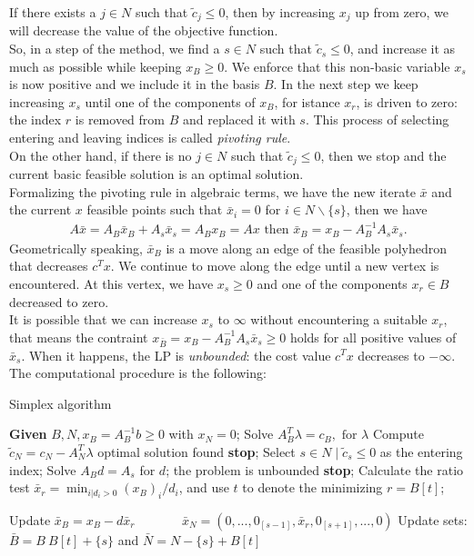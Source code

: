 \documentclass[a4paper,10 pt,titlepage,twoside]{book}
\theoremstyle{plain}
\theoremstyle{definition}
\theoremstyle{remark}
\begin{document}
 If there exists a $j \in N$ such that $\widetilde{c}_{j} \leq 0$, then by increasing $x_{j}$ up from zero, we will decrease the value of the objective function.\\
So, in a step of the method, we find a $s \in N$ such that $\widetilde{c}_{s} \leq 0$, and increase it as much as possible while keeping $x_{B} \geq 0$. We enforce that this non-basic variable $x_{s}$ is now positive and we include it in the basis $B$.
In the next step we keep increasing $x_{s}$ until one of the components of $x_{B}$, for istance $x_{r}$, is driven to zero: the index $r$ is removed from $B$ and replaced it with $s$. This process of selecting entering and leaving indices is called \textit{pivoting rule}. \\
On the other hand, if there is no $j \in N$ such that $\widetilde{c}_{j} \leq 0$, then we stop and the current basic feasible solution is an optimal solution. \\
Formalizing the pivoting rule in algebraic terms, we have the new iterate $\bar{x}$ and the current $x$ feasible points such that $\bar{x}_{i} = 0$ for $i \in N\backslash\{s\}$, then we have 
\begin{align*}
	A\bar{x} = A_{B}\bar{x}_{B} +A_{s}\bar{x}_{s} = A_{B}x_{B} = Ax \text{  then }
	\bar{x}_{B} = x_{B} - A_{B}^{-1}A_{s}\bar{x}_{s}.
\end{align*}
Geometrically speaking, $\bar{x}_{B}$ is a move along an edge of the feasible polyhedron that decreases $c^{T}x$. We continue to move along the edge until a new vertex is encountered. At this vertex, we have $x_{s}\geq0$ and one of the components $x_{r}\in B$ decreased to zero.\\
It is possible that we can increase $x_{s}$ to $\infty$ without encountering a suitable $x_{r}$, that means the contraint $x_{\bar{B}} = x_{B} - A_{B}^{-1}A_{s}\bar{x}_{s} \geq0$ holds for all positive values of $\bar{x}_{s}$. When it happens, the LP is \textit{unbounded}: the cost value $c^{T}x$ decreases to $-\infty$.\\
The computational procedure is the following:
\begin{algorithm}
	\caption{Simplex algorithm}
	\begin{algorithmic}[1]
		\State \textbf{Given} $B, N, x_{B} = A_{B}^{-1}b\geq 0$ with $x_{N}=0$;
		\State Solve $A_{B}^{T}\lambda = c_{B}, \text{ for }\lambda$
		\State Compute $\widetilde{c}_{N}=c_{N}-A_{N}^{T}\lambda$
		 optimal solution found \textbf{stop}; 
		\Else
		\State 	Select $s\in N\;|\;\widetilde{c}_{s}\leq 0$ as the entering index;
		\State Solve $A_{B}d = A_{s}$ for $d$;
		 the problem is unbounded \textbf{stop};
		\Else 
		\State Calculate the ratio test $\bar{x}_{r} = \min_{i | d_{i} > 0}(x_{B})_{i}/d_{i}$, and \State use $t$ to denote the minimizing $r = B[t]$;
		
		\State Update $\bar{x}_{B} = x_{B}-d\bar{x}_{r}$
		\State $\;\;\;\;\;\;\;\;\;\;\;\;\bar{x}_{N} = (0,...,0_{[s-1]},\bar{x}_{r},0_{[s+1]},...,0)$
		\State Update sets: $\bar{B} = B \ B[t] + \{s\}$ and $\bar{N} = N - \{s\} + B[t]$	
		\End
	\end{algorithmic}
\end{algorithm}
\end{document}
